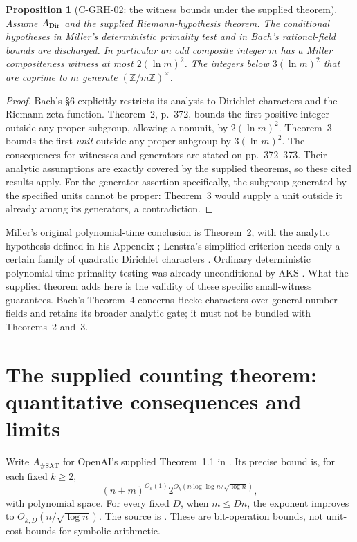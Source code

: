 \documentclass[11pt,a4paper]{article}
\newtheorem{proposition}{Proposition}[section]
\begin{document}
\begin{proposition}[C-GRH-02: the witness bounds under the supplied theorem]
Assume \(A_{\rm Dir}\) and the supplied Riemann-hypothesis theorem.
The conditional hypotheses in Miller's deterministic primality test and in
Bach's rational-field bounds are discharged.  In particular an odd
composite integer \(m\) has a Miller compositeness witness at most
\(2(\ln m)^2\).  The integers below \(3(\ln m)^2\) that are coprime to
\(m\) generate \((\mathbb Z/m\mathbb Z)^\times\).
\end{proposition}
\begin{proof}
Bach's \S6 explicitly restricts its analysis to Dirichlet characters and
the Riemann zeta function.  Theorem~2, p.~372, bounds the first positive
integer outside any proper subgroup, allowing a nonunit, by
\(2(\ln m)^2\).  Theorem~3 bounds the first \emph{unit} outside any
proper subgroup by \(3(\ln m)^2\).  The consequences for witnesses and
generators are stated on pp.~372--373.  Their analytic assumptions are
exactly covered by the supplied theorems, so these cited results apply.
For the generator assertion specifically, the subgroup generated by the
specified units cannot be proper: Theorem~3 would supply a unit outside
it already among its generators, a contradiction.
\end{proof}

Miller's original polynomial-time conclusion is Theorem~2, with the
analytic hypothesis defined in his Appendix \cite{CMiller76}; Lenstra's
simplified criterion needs only a certain family of quadratic Dirichlet
characters \cite[Theorem~1]{CLenstra79}.  Ordinary deterministic
polynomial-time primality testing was already unconditional by AKS
\cite[Theorems~4.1 and 5.1]{CAKS04}.  What the supplied theorem adds here
is the validity of these specific small-witness guarantees.  Bach's
Theorem~4 concerns Hecke characters over general number fields and retains
its broader analytic gate; it must not be bundled with Theorems~2 and~3.

\section{The supplied counting theorem: quantitative consequences and limits}
\label{sec:complexity-eth}

Write \(A_{\#\mathrm{SAT}}\) for OpenAI's supplied Theorem~1.1 in
.  Its precise
bound is, for each fixed \(k\ge2\),
\[
 (n+m)^{O_k(1)}2^{O_k(n\log\log n/\sqrt{\log n})},
\]
with polynomial space.  For every fixed \(D\), when \(m\le Dn\), the
exponent improves to \(O_{k,D}(n/\sqrt{\log n})\).  The source is
\cite[Theorem~1.1; Appendix~D]{COAI26}.  These are bit-operation bounds,
not unit-cost bounds for symbolic arithmetic.
\end{document}
